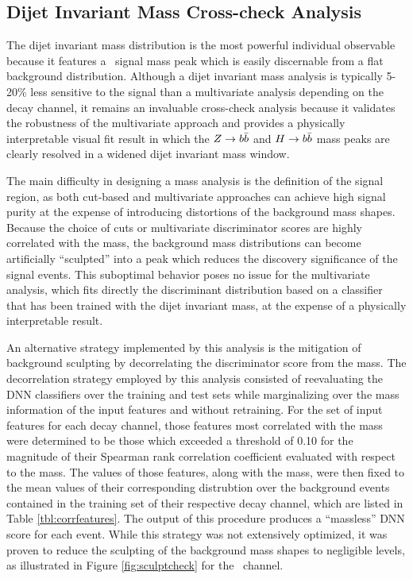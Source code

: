 \subsection{Dijet Invariant Mass Cross-check Analysis}

The dijet invariant mass distribution is the most powerful individual observable because it features a \VHbb\ signal mass peak which is easily discernable from a flat background distribution. Although a dijet invariant mass analysis is typically 5-20\% less sensitive to the signal than a multivariate analysis depending on the decay channel, it remains an invaluable cross-check analysis because it validates the robustness of the multivariate approach and provides a physically interpretable visual fit result in which the $Z \rightarrow b\bar{b}$ and $H \rightarrow b\bar{b}$ mass peaks are clearly resolved in a widened dijet invariant mass window.

The main difficulty in designing a mass analysis is the definition of the signal region, as both cut-based and multivariate approaches can achieve high signal purity at the expense of introducing distortions of the background mass shapes. Because the choice of cuts or multivariate discriminator scores are highly correlated with the mass, the background mass distributions can become artificially ``sculpted'' into a peak which reduces the discovery significance of the signal events. This suboptimal behavior poses no issue for the multivariate analysis, which fits directly the discriminant distribution based on a classifier that has been trained with the dijet invariant mass, at the expense of a physically interpretable result.

An alternative strategy implemented by this analysis is the mitigation of background sculpting by decorrelating the discriminator score from the mass. The decorrelation strategy employed by this analysis consisted of reevaluating the DNN classifiers over the training and test sets while marginalizing over the mass information of the input features and without retraining. For the set of input features for each decay channel, those features most correlated with the mass were determined to be those which exceeded a threshold of 0.10 for the magnitude of their Spearman rank correlation coefficient evaluated with respect to the mass. The values of those features, along with the mass, were then fixed to the mean values of their corresponding distrubtion over the background events contained in the training set of their respective decay channel, which are listed in Table \ref{tbl:corrfeatures}. The output of this procedure produces a ``massless'' DNN score for each event. While this strategy was not extensively optimized, it was proven to reduce the sculpting of the background mass shapes to negligible levels, as illustrated in Figure \ref{fig:sculptcheck} for the \ZnnH\ channel.

